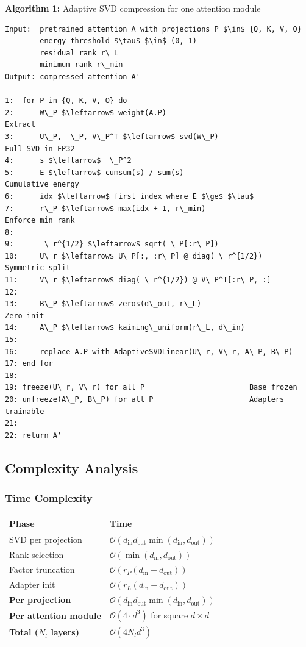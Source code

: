 \textbf{Algorithm 1:} Adaptive SVD compression for one attention module
\begin{lstlisting}
Input:  pretrained attention A with projections P $\in$ {Q, K, V, O}
        energy threshold $\tau$ $\in$ (0, 1)
        residual rank r\_L
        minimum rank r\_min
Output: compressed attention A'

1:  for P in {Q, K, V, O} do
2:      W\_P $\leftarrow$ weight(A.P)                              Extract
3:      U\_P,  \_P, V\_P^T $\leftarrow$ svd(W\_P)                     Full SVD in FP32
4:      s $\leftarrow$  \_P^2
5:      E $\leftarrow$ cumsum(s) / sum(s)                        Cumulative energy
6:      idx $\leftarrow$ first index where E $\ge$ $\tau$
7:      r\_P $\leftarrow$ max(idx + 1, r\_min)                     Enforce min rank
8:
9:       \_r^{1/2} $\leftarrow$ sqrt( \_P[:r\_P])
10:     U\_r $\leftarrow$ U\_P[:, :r\_P] @ diag( \_r^{1/2})          Symmetric split
11:     V\_r $\leftarrow$ diag( \_r^{1/2}) @ V\_P^T[:r\_P, :]
12:
13:     B\_P $\leftarrow$ zeros(d\_out, r\_L)                       Zero init
14:     A\_P $\leftarrow$ kaiming\_uniform(r\_L, d\_in)
15:
16:     replace A.P with AdaptiveSVDLinear(U\_r, V\_r, A\_P, B\_P)
17: end for
18:
19: freeze(U\_r, V\_r) for all P                        Base frozen
20: unfreeze(A\_P, B\_P) for all P                      Adapters trainable
21:
22: return A'
\end{lstlisting}

\subsection{Complexity Analysis}

\subsubsection{Time Complexity}

\begin{table}[H]
\centering
\small
\begin{tabular}{ll}
\toprule
\textbf{Phase} & \textbf{Time} \\
\midrule
SVD per projection & $\mathcal{O}(d_\text{in} d_\text{out} \min(d_\text{in}, d_\text{out}))$ \\
Rank selection & $\mathcal{O}(\min(d_\text{in}, d_\text{out}))$ \\
Factor truncation & $\mathcal{O}(r_P (d_\text{in} + d_\text{out}))$ \\
Adapter init & $\mathcal{O}(r_L (d_\text{in} + d_\text{out}))$ \\
\textbf{Per projection} & $\mathcal{O}(d_\text{in} d_\text{out} \min(d_\text{in}, d_\text{out}))$ \\
\textbf{Per attention module} & $\mathcal{O}(4 \cdot d^3)$ for square $d \times d$ \\
\textbf{Total ($N_l$ layers)} & $\mathcal{O}(4 N_l d^3)$ \\
\bottomrule
\end{tabular}
\end{table}

